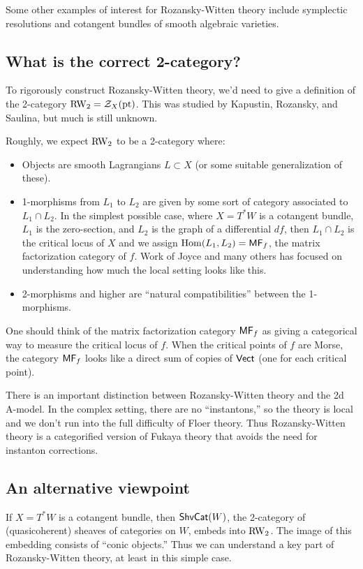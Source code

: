 \documentclass{article}
\begin{document}
Some other examples of interest for Rozansky-Witten theory include symplectic resolutions and cotangent bundles of smooth algebraic varieties.

\subsection{What is the correct 2-category?}

To rigorously construct Rozansky-Witten theory, we'd need to give a definition of the 2-category $\operatorname{RW}_2 = \mathcal{Z}_X(\operatorname{pt})$.
This was studied by Kapustin, Rozansky, and Saulina, but much is still unknown.

Roughly, we expect $\operatorname{RW}_2$ to be a 2-category where:
\begin{itemize}
	\item Objects are smooth Lagrangians $L \subset X$ (or some suitable generalization of these).
	\item 1-morphisms from $L_1$ to $L_2$ are given by some sort of category associated to $L_1 \cap L_2$.
		In the simplest possible case, where $X = T^* W$ is a cotangent bundle, $L_1$ is the zero-section, and $L_2$ is the graph of a differential $df$, then $L_1 \cap L_2$ is the critical locus of $X$ and we assign $\operatorname{Hom}(L_1, L_2) = \mathsf{MF}_f$, the matrix factorization category of $f$.
		Work of Joyce and many others has focused on understanding how much the local setting looks like this.
	\item 2-morphisms and higher are ``natural compatibilities'' between the 1-morphisms.
\end{itemize}

One should think of the matrix factorization category $\mathsf{MF}_f$ as giving a categorical way to measure the critical locus of $f$.
When the critical points of $f$ are Morse, the category $\mathsf{MF}_f$ looks like a direct sum of copies of $\mathsf{Vect}$ (one for each critical point).

There is an important distinction between Rozansky-Witten theory and the 2d A-model.
In the complex setting, there are no ``instantons,'' so the theory is local and we don't run into the full difficulty of Floer theory.
Thus Rozansky-Witten theory is a categorified version of Fukaya theory that avoids the need for instanton corrections.

\subsection{An alternative viewpoint}

If $X = T^* W$ is a cotangent bundle, then $\mathsf{ShvCat}(W)$, the 2-category of (quasicoherent) sheaves of categories on $W$, embeds into $\operatorname{RW}_2$.
The image of this embedding consists of ``conic objects.''
Thus we can understand a key part of Rozansky-Witten theory, at least in this simple case.
\end{document}
